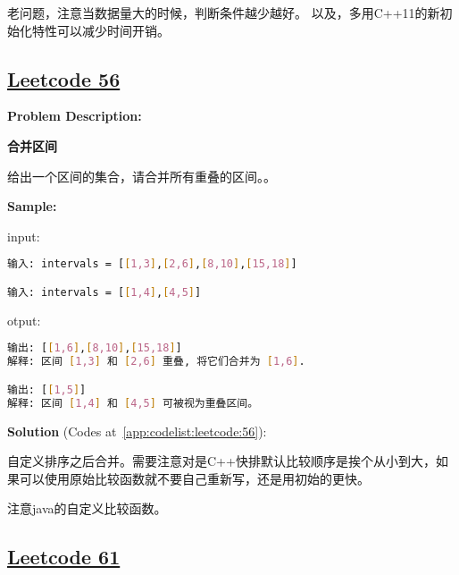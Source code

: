 老问题，注意当数据量大的时候，判断条件越少越好。
以及，多用C++11的新初始化特性可以减少时间开销。\par



\subsection{\href{https://leetcode-cn.com/}{Leetcode 56}}\label{app:problemlist:leetcode:56}

\textbf{Problem Description:}\par

\textbf{合并区间}\par

给出一个区间的集合，请合并所有重叠的区间。。\par


\textbf{Sample:}\par

input:\par

\begin{lstlisting}[language=bash]
输入: intervals = [[1,3],[2,6],[8,10],[15,18]]

输入: intervals = [[1,4],[4,5]]
\end{lstlisting}

otput:\par

\begin{lstlisting}[language=bash]
输出: [[1,6],[8,10],[15,18]]
解释: 区间 [1,3] 和 [2,6] 重叠, 将它们合并为 [1,6].

输出: [[1,5]]
解释: 区间 [1,4] 和 [4,5] 可被视为重叠区间。
\end{lstlisting}

\textbf{Solution }(Codes at~\ref{app:codelist:leetcode:56}):\par

自定义排序之后合并。需要注意对是C++快排默认比较顺序是挨个从小到大，如果可以使用原始比较函数就不要自己重新写，还是用初始的更快。\par

注意java的自定义比较函数。\par



\subsection{\href{https://leetcode-cn.com/}{Leetcode 61}}\label{app:problemlist:leetcode:61}

